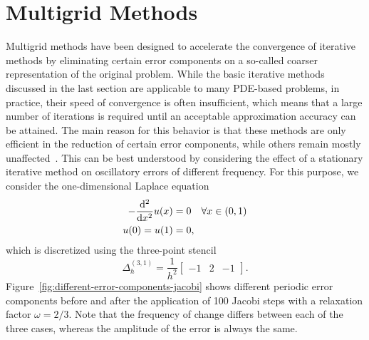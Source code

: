 \section{Multigrid Methods}
Multigrid methods have been designed to accelerate the convergence of iterative methods by eliminating certain error components on a so-called coarser representation of the original problem.
While the basic iterative methods discussed in the last section are applicable to many PDE-based problems, in practice, their speed of convergence is often insufficient, which means that a large number of iterations is required until an acceptable approximation accuracy can be attained. 
The main reason for this behavior is that these methods are only efficient in the reduction of certain error components, while others remain mostly unaffected~\cite{briggs2000multigrid}.
This can be best understood by considering the effect of a stationary iterative method on oscillatory errors of different frequency.
For this purpose, we consider the one-dimensional Laplace equation
\begin{equation}
		\begin{split}
			- \dv[2]{x} u(x) & = 0 \quad \forall x \in (0, 1) \\
			u(0) = u(1) & = 0,
		\end{split}
		\label{eq:1D-laplace-model}
\end{equation}
which is discretized using the three-point stencil
\begin{equation}
	\Delta_h^{(3, 1)} = \frac{1}{h^2}\begin{bmatrix}
		-1 & 2 & -1
	\end{bmatrix}.
\end{equation} 
Figure~\ref{fig:different-error-components-jacobi} shows different periodic error components before and after the application of 100 Jacobi steps with a relaxation factor $\omega = 2/3$.
Note that the frequency of change differs between each of the three cases, whereas the amplitude of the error is always the same.

